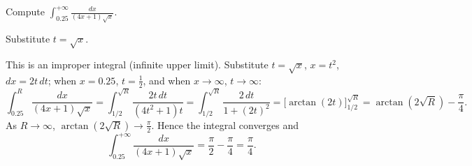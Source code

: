
\begin{question}
Compute $\displaystyle\int_{0.25}^{+\infty}\frac{dx}{(4x+1)\sqrt{x}}$.
\end{question}

\begin{hint}
Substitute $t=\sqrt x$.
\end{hint}

\begin{solution}
This is an improper integral (infinite upper limit). Substitute $t=\sqrt x$, $x=t^2$, $dx=2t\,dt$; when $x=0.25$, $t=\frac12$, and when $x\to\infty$, $t\to\infty$:
\[ \int_{0.25}^{R}\frac{dx}{(4x+1)\sqrt x}=\int_{1/2}^{\sqrt R}\frac{2t\,dt}{(4t^2+1)t}=\int_{1/2}^{\sqrt R}\frac{2\,dt}{1+(2t)^2}=\Big[\arctan(2t)\Big]_{1/2}^{\sqrt R}=\arctan(2\sqrt R)-\frac{\pi}{4}. \]
As $R\to\infty$, $\arctan(2\sqrt R)\to\frac\pi2$. Hence the integral converges and
\[ \int_{0.25}^{+\infty}\frac{dx}{(4x+1)\sqrt{x}}=\frac\pi2-\frac\pi4=\boxed{\frac{\pi}{4}} . \]
\end{solution}
